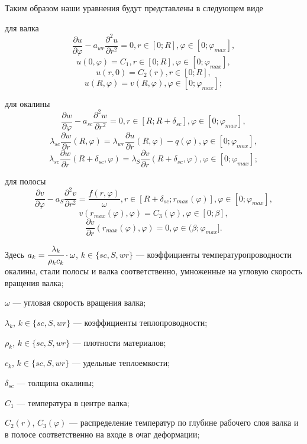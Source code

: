 Таким образом наши уравнения будут представлены в следующем виде \cite{acinpaper}

для валка
\begin{equation}
\frac{\partial u}{\partial \varphi} - a_{wr} \frac{\partial^2u}{\partial r^2} = 0, r \in [0; R], \varphi \in [0; \varphi_{max}],
\label{difur_wr}
\end{equation}
$$u(0,\varphi)=C_1, r \in [0; R], \varphi \in [0; \varphi_{max}],$$
$$u(r,0)=C_2(r), r \in [0; R],$$
$$u(R,\varphi)=v(R,\varphi), \varphi \in [0; \varphi_{max}];$$

для окалины
\begin{equation}
\frac{\partial w}{\partial \varphi} - a_{sc} \frac{\partial^2w}{\partial r^2} = 0, r \in [R; R+\delta_{sc}], \varphi \in [0; \varphi_{max}],
\label{difur_sc}
\end{equation}
$$\lambda_{sc} \frac{\partial w}{\partial r}(R,\varphi) = \lambda_{wr} \frac{\partial u}{\partial r}(R,\varphi) - q(\varphi), \varphi \in [0; \varphi_{max}],$$
$$\lambda_{sc} \frac{\partial w}{\partial r}(R+\delta_{sc},\varphi) = \lambda_{S} \frac{\partial v}{\partial r}(R+\delta_{sc},\varphi), \varphi \in [0; \varphi_{max}];$$

для полосы
\begin{equation}
\frac{\partial v}{\partial \varphi} - a_S \frac{\partial^2v}{\partial r^2} = \frac{f(r, \varphi)}{\omega}, r \in [R+\delta_{sc}; r_{max}(\varphi)], \varphi \in [0; \varphi_{max}],
\label{difur_S}
\end{equation}
$$v(r_{max}(\varphi), \varphi) = C_3(\varphi), \varphi \in [0; \beta],$$
$$\frac{\partial v}{\partial r}(r_{max}(\varphi), \varphi) = 0, \varphi \in (\beta; \varphi_{max}].$$

Здесь $a_k = \cfrac{\lambda_k}{\rho_k c_k}\cdot \omega $, $k \in \{sc, S, wr\}$ — коэффициенты температуропроводности окалины, стали полосы и валка соответственно, умноженные на угловую скорость вращения валка;

$\omega$ — угловая скорость вращения валка;

$\lambda_{k}$, $k \in \{sc, S, wr\}$ — коэффициенты теплопроводности;

$\rho_k$, $k \in \{sc, S, wr\}$ — плотности материалов; 

$c_k$, $k \in \{sc, S, wr\}$ — удельные теплоемкости;

$\delta_{sc}$ — толщина окалины; 

$C_1$ — температура в центре валка;

$C_2(r)$, $C_3(\varphi)$ — распределение температур по глубине рабочего слоя валка и в полосе соответственно на входе в очаг деформации; 

